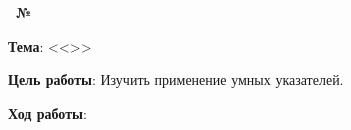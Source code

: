 \begin{center}
    \textbf{\titlePageWorkType~№\titlePageWorkNumber}
\end{center}

\textbf{Тема}: <<\titlePageTopic>>

\textbf{Цель работы}:
Изучить применение умных указателей.

\begin{center}
    \textbf{Ход работы}:
\end{center}



